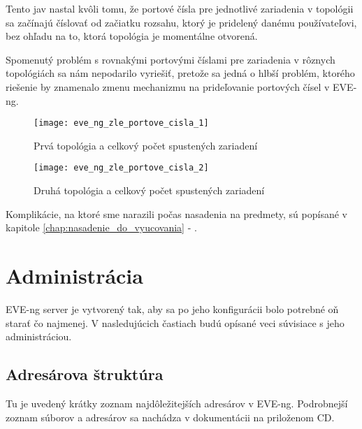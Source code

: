 Tento jav nastal kvôli tomu, že portové čísla pre jednotlivé zariadenia v topológii sa začínajú číslovať od začiatku rozsahu, ktorý je pridelený danému používateľovi, bez ohľadu na to, ktorá topológia je momentálne otvorená.

Spomenutý problém s rovnakými portovými číslami pre zariadenia v rôznych topológiách sa nám nepodarilo vyriešiť, pretože sa jedná o hlbší problém, ktorého riešenie by znamenalo zmenu mechanizmu na prideľovanie portových čísel v EVE-ng.

\begin{figure}
    \centering
    \texttt{[image: eve\_ng\_zle\_portove\_cisla\_1]}
    \caption{Prvá topológia a celkový počet spustených zariadení}
    \label{obr:eve_ng_zle_portove_cisla_1}
\end{figure}

\begin{figure}
    \centering
    \texttt{[image: eve\_ng\_zle\_portove\_cisla\_2]}
    \caption{Druhá topológia a celkový počet spustených zariadení}
    \label{obr:eve_ng_zle_portove_cisla_2}
\end{figure}

Komplikácie, na ktoré sme narazili počas nasadenia na predmety, sú popísané v kapitole \ref{chap:nasadenie_do_vyucovania} - .




\section{Administrácia}

EVE-ng server je vytvorený tak, aby sa po jeho konfigurácii bolo potrebné oň starať čo najmenej. V nasledujúcich častiach budú opísané veci súvisiace s jeho administráciou.




\subsection{Adresárova štruktúra}
\label{chap:adresarova_struktura}

Tu je uvedený krátky zoznam najdôležitejších adresárov v EVE-ng. Podrobnejší zoznam súborov a adresárov sa nachádza v dokumentácii na priloženom CD.


